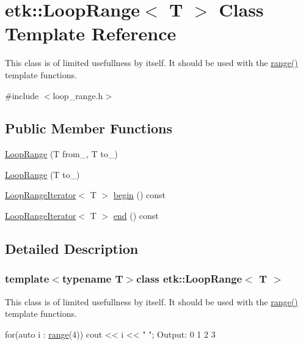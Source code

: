 \hypertarget{classetk_1_1_loop_range}{\section{etk\-:\-:Loop\-Range$<$ T $>$ Class Template Reference}
\label{classetk_1_1_loop_range}
}


This class is of limited usefullness by itself. It should be used with the \hyperlink{namespaceetk_aff39b0f367ee4d947e2e7d297ffd506b}{range()} template functions.  




{\ttfamily \#include $<$loop\-\_\-range.\-h$>$}

\subsection*{Public Member Functions}
\begin{DoxyCompactItemize}
\item 
\hyperlink{classetk_1_1_loop_range_a3520ba367e7ad86c8e3fb5ecd7a63692}{Loop\-Range} (T from\-\_\-, T to\-\_\-)
\item 
\hyperlink{classetk_1_1_loop_range_a6e74f73210af0ff35a8c701f9243c4b3}{Loop\-Range} (T to\-\_\-)
\item 
\hyperlink{classetk_1_1_loop_range_iterator}{Loop\-Range\-Iterator}$<$ T $>$ \hyperlink{classetk_1_1_loop_range_a03dc63b4ba3c7ff6d0c8b4be80295976}{begin} () const 
\item 
\hyperlink{classetk_1_1_loop_range_iterator}{Loop\-Range\-Iterator}$<$ T $>$ \hyperlink{classetk_1_1_loop_range_a5b531d7156af411cbceab6c6c039ee84}{end} () const 
\end{DoxyCompactItemize}


\subsection{Detailed Description}
\subsubsection*{template$<$typename T$>$class etk\-::\-Loop\-Range$<$ T $>$}

This class is of limited usefullness by itself. It should be used with the \hyperlink{namespaceetk_aff39b0f367ee4d947e2e7d297ffd506b}{range()} template functions. 


\begin{DoxyCode}
\textcolor{keywordflow}{for}(\textcolor{keyword}{auto} i : \hyperlink{namespaceetk_aff39b0f367ee4d947e2e7d297ffd506b}{range}(4))
    cout << i << \textcolor{stringliteral}{" "};
  Output: 0 1 2 3
\end{DoxyCode}
 
